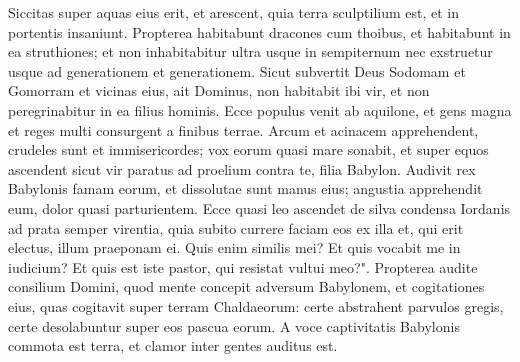 \begin{biblechapter}
\verse Siccitas super aquas eius erit, et arescent, quia terra sculptilium est, et in portentis insaniunt. 
\verse Propterea habitabunt dracones cum thoibus, et habitabunt in ea struthiones; et non inhabitabitur ultra usque in sempiternum nec exstruetur usque ad generationem et generationem. 
\verse Sicut subvertit Deus Sodomam et Gomorram et vicinas eius, ait Dominus, non habitabit ibi vir, et non peregrinabitur in ea filius hominis. 
\verse Ecce populus venit ab aquilone, et gens magna et reges multi consurgent a finibus terrae. 
\verse Arcum et acinacem apprehendent, crudeles sunt et immisericordes; vox eorum quasi mare sonabit, et super equos ascendent sicut vir paratus ad proelium contra te, filia Babylon. 
\verse Audivit rex Babylonis famam eorum, et dissolutae sunt manus eius; angustia apprehendit eum, dolor quasi parturientem. 
\verse Ecce quasi leo ascendet de silva condensa Iordanis ad prata semper virentia, quia subito currere faciam eos ex illa et, qui erit electus, illum praeponam ei. Quis enim similis mei? Et quis vocabit me in iudicium? Et quis est iste pastor, qui resistat vultui meo?". 
\verse Propterea audite consilium Domini, quod mente concepit adversum Babylonem, et cogitationes eius, quas cogitavit super terram Chaldaeorum: certe abstrahent parvulos gregis, certe desolabuntur super eos pascua eorum. 
\verse A voce captivitatis Babylonis commota est terra, et clamor inter gentes auditus est. 
\end{biblechapter}


